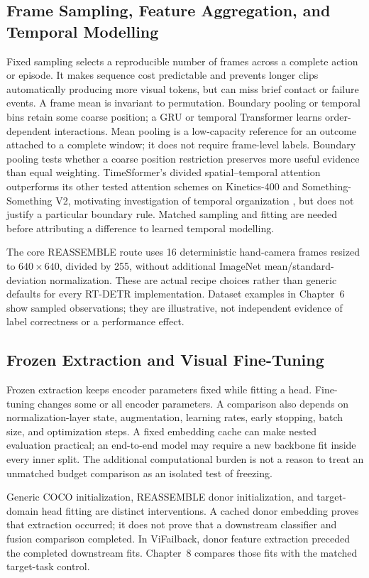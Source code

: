 \subsection{Frame Sampling, Feature Aggregation, and Temporal Modelling}
Fixed sampling selects a reproducible number of frames across a complete action or episode. It makes sequence cost predictable and prevents longer clips automatically producing more visual tokens, but can miss brief contact or failure events. A frame mean is invariant to permutation. Boundary pooling or temporal bins retain some coarse position; a GRU or temporal Transformer learns order-dependent interactions. Mean pooling is a low-capacity reference for an outcome attached to a complete window; it does not require frame-level labels. Boundary pooling tests whether a coarse position restriction preserves more useful evidence than equal weighting. TimeSformer's divided spatial--temporal attention outperforms its other tested attention schemes on Kinetics-400 and Something-Something V2, motivating investigation of temporal organization \citep[Table~1]{P034}, but does not justify a particular boundary rule. Matched sampling and fitting are needed before attributing a difference to learned temporal modelling.

The core REASSEMBLE route uses 16 deterministic hand-camera frames resized to $640\times640$, divided by 255, without additional ImageNet mean/standard-deviation normalization. These are actual recipe choices rather than generic defaults for every RT-DETR implementation. Dataset examples in Chapter~6 show sampled observations; they are illustrative, not independent evidence of label correctness or a performance effect.

\subsection{Frozen Extraction and Visual Fine-Tuning}
Frozen extraction keeps encoder parameters fixed while fitting a head. Fine-tuning changes some or all encoder parameters. A comparison also depends on normalization-layer state, augmentation, learning rates, early stopping, batch size, and optimization steps. A fixed embedding cache can make nested evaluation practical; an end-to-end model may require a new backbone fit inside every inner split. The additional computational burden is not a reason to treat an unmatched budget comparison as an isolated test of freezing.

Generic COCO initialization, REASSEMBLE donor initialization, and target-domain head fitting are distinct interventions. A cached donor embedding proves that extraction occurred; it does not prove that a downstream classifier and fusion comparison completed. In ViFailback, donor feature extraction preceded the completed downstream fits. Chapter~8 compares those fits with the matched target-task control.

